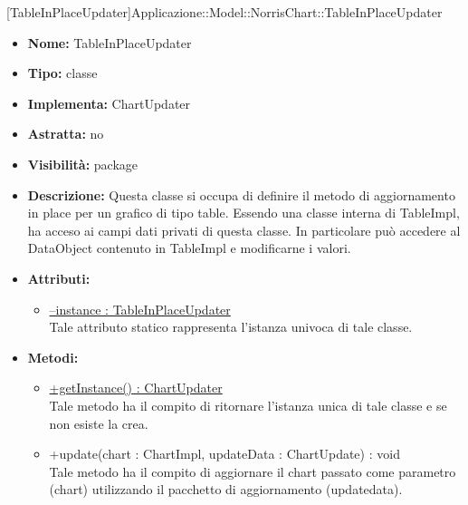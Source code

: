 			
			[TableInPlaceUpdater]{Applicazione::Model::NorrisChart::TableInPlaceUpdater}
			

	
			
			\begin{itemize}
			\item \textbf{Nome:} TableInPlaceUpdater
			\item \textbf{Tipo:} classe
			
		\item \textbf{Implementa:}
		ChartUpdater
		\item \textbf{Astratta:}
		no
			\item \textbf{Visibilità:} package
			\item \textbf{Descrizione:} Questa classe si occupa di definire il metodo di aggiornamento in place per un grafico di tipo table. Essendo una classe interna di TableImpl, ha acceso ai campi dati privati di questa classe. In particolare può accedere al DataObject contenuto in TableImpl e modificarne i valori.
			\item \textbf{Attributi:}
				\begin{itemize}
				\setlength{\itemsep}{5pt}
				
					\item[\ding{111}] \underline{--instance : TableInPlaceUpdater} \\ [1mm] Tale attributo statico rappresenta l'istanza univoca di tale classe.
				\end{itemize}
		
			\item \textbf{Metodi:}
				\begin{itemize}
				\setlength{\itemsep}{5pt}
				
					\item[\ding{111}] {\underline{+getInstance() : ChartUpdater}} \\ [1mm] Tale metodo ha il compito di ritornare l'istanza unica di tale classe e se non esiste la crea.
					\item[\ding{111}] {{+update(chart : ChartImpl, updateData : ChartUpdate) : void}} \\ [1mm] Tale metodo ha il compito di aggiornare il chart passato come parametro (chart) utilizzando il pacchetto di aggiornamento (updatedata).
				\end{itemize}
		
			\end{itemize}

